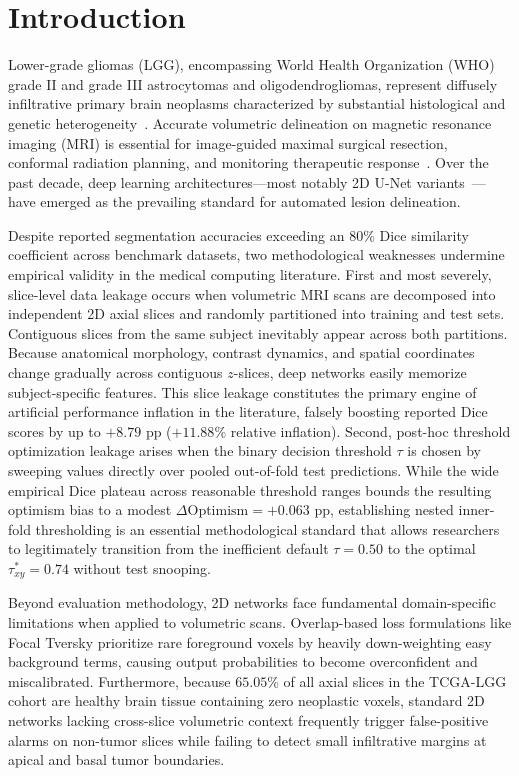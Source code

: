 \documentclass[preprint,12pt,authoryear]{elsarticle}
\begin{document}
\clearpage

\section{Introduction}
\label{sec:intro}

Lower-grade gliomas (LGG), encompassing World Health Organization (WHO) grade II and grade III astrocytomas and oligodendrogliomas, represent diffusely infiltrative primary brain neoplasms characterized by substantial histological and genetic heterogeneity~\citep{louis20212021,ceccarelli2016molecular}. Accurate volumetric delineation on magnetic resonance imaging (MRI) is essential for image-guided maximal surgical resection, conformal radiation planning, and monitoring therapeutic response~\citep{buda2019association}. Over the past decade, deep learning architectures---most notably 2D U-Net variants~\citep{ronneberger2015u,zhou2018unetplusplus,oktay2018attention}---have emerged as the prevailing standard for automated lesion delineation. 

Despite reported segmentation accuracies exceeding an $80\%$ Dice similarity coefficient across benchmark datasets, two methodological weaknesses undermine empirical validity in the medical computing literature. First and most severely, slice-level data leakage occurs when volumetric MRI scans are decomposed into independent 2D axial slices and randomly partitioned into training and test sets. Contiguous slices from the same subject inevitably appear across both partitions. Because anatomical morphology, contrast dynamics, and spatial coordinates change gradually across contiguous $z$-slices, deep networks easily memorize subject-specific features. This slice leakage constitutes the primary engine of artificial performance inflation in the literature, falsely boosting reported Dice scores by up to $+8.79\text{ pp}$ ($+11.88\%$ relative inflation). Second, post-hoc threshold optimization leakage arises when the binary decision threshold $\tau$ is chosen by sweeping values directly over pooled out-of-fold test predictions. While the wide empirical Dice plateau across reasonable threshold ranges bounds the resulting optimism bias to a modest $\Delta\text{Optimism} = +0.063\text{ pp}$, establishing nested inner-fold thresholding is an essential methodological standard that allows researchers to legitimately transition from the inefficient default $\tau=0.50$ to the optimal $\tau_{xy}^* = 0.74$ without test snooping.

Beyond evaluation methodology, 2D networks face fundamental domain-specific limitations when applied to volumetric scans. Overlap-based loss formulations like Focal Tversky prioritize rare foreground voxels by heavily down-weighting easy background terms, causing output probabilities to become overconfident and miscalibrated. Furthermore, because $65.05\%$ of all axial slices in the TCGA-LGG cohort are healthy brain tissue containing zero neoplastic voxels, standard 2D networks lacking cross-slice volumetric context frequently trigger false-positive alarms on non-tumor slices while failing to detect small infiltrative margins at apical and basal tumor boundaries.
\end{document}
